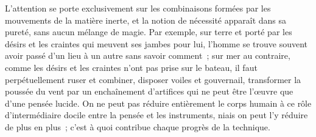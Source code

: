 \documentclass[french,twoside]{book} %
\begin{document}
L'attention se porte exclusivement sur les combinaisons formées par les mouvements de la matière inerte, et la notion de nécessité apparaît dans sa pureté, sans aucun mélange de magie. Par exemple, sur terre et porté par les désirs et les craintes qui meuvent ses jambes pour lui, l'homme se trouve souvent avoir passé d'un lieu à un autre sans savoir comment ; sur mer au contraire, comme les désirs et les craintes n'ont pas prise sur le bateau, il faut perpétuellement ruser et combiner, disposer voiles et gouvernail, transformer la poussée du vent par un enchaînement d'artifices qui ne peut être l'œuvre que d'une pensée lucide. On ne peut pas réduire entièrement le corps humain à ce rôle d'intermédiaire docile entre la pensée et les instruments, niais on peut l'y réduire de plus en plus ; c'est à quoi contribue chaque progrès de la technique.\par
\end{document}
